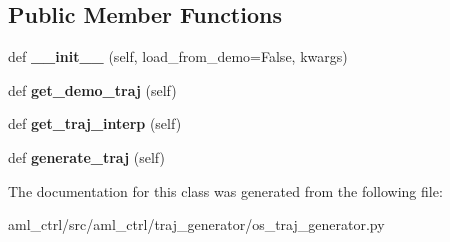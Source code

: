 \subsection*{Public Member Functions}
\begin{DoxyCompactItemize}
\item 
\hypertarget{classaml__ctrl_1_1traj__generator_1_1os__traj__generator_1_1_o_s_traj_generator_a8bf4e10c17b615549568560bff01af40}{}\label{classaml__ctrl_1_1traj__generator_1_1os__traj__generator_1_1_o_s_traj_generator_a8bf4e10c17b615549568560bff01af40} 
def {\bfseries \+\_\+\+\_\+init\+\_\+\+\_\+} (self, load\+\_\+from\+\_\+demo=False, kwargs)
\item 
\hypertarget{classaml__ctrl_1_1traj__generator_1_1os__traj__generator_1_1_o_s_traj_generator_a4c8c1133e007e964069e0b6e26c231e8}{}\label{classaml__ctrl_1_1traj__generator_1_1os__traj__generator_1_1_o_s_traj_generator_a4c8c1133e007e964069e0b6e26c231e8} 
def {\bfseries get\+\_\+demo\+\_\+traj} (self)
\item 
\hypertarget{classaml__ctrl_1_1traj__generator_1_1os__traj__generator_1_1_o_s_traj_generator_a664f45347cc9f85ef0060a73f06ea3ce}{}\label{classaml__ctrl_1_1traj__generator_1_1os__traj__generator_1_1_o_s_traj_generator_a664f45347cc9f85ef0060a73f06ea3ce} 
def {\bfseries get\+\_\+traj\+\_\+interp} (self)
\item 
\hypertarget{classaml__ctrl_1_1traj__generator_1_1os__traj__generator_1_1_o_s_traj_generator_a42babd47c45ecc1257dcf131aabf7aea}{}\label{classaml__ctrl_1_1traj__generator_1_1os__traj__generator_1_1_o_s_traj_generator_a42babd47c45ecc1257dcf131aabf7aea} 
def {\bfseries generate\+\_\+traj} (self)
\end{DoxyCompactItemize}


The documentation for this class was generated from the following file\+:\begin{DoxyCompactItemize}
\item 
aml\+\_\+ctrl/src/aml\+\_\+ctrl/traj\+\_\+generator/os\+\_\+traj\+\_\+generator.\+py\end{DoxyCompactItemize}
